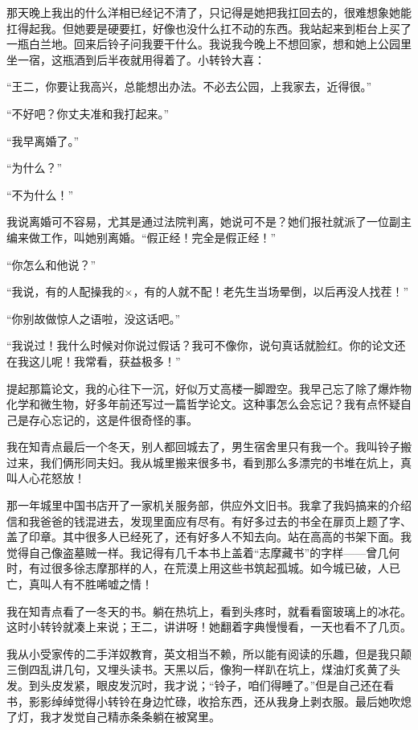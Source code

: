  那天晚上我出的什么洋相已经记不清了，只记得是她把我扛回去的，很难想象她能扛得起我。但她要是硬要扛，好像也没什么扛不动的东西。我站起来到柜台上买了一瓶白兰地。回来后铃子问我要干什么。我说我今晚上不想回家，想和她上公园里坐一宿，这瓶酒到后半夜就用得着了。小转铃大喜： 
 
 “王二，你要让我高兴，总能想出办法。不必去公园，上我家去，近得很。” 
 
 “不好吧？你丈夫准和我打起来。” 
 
 “我早离婚了。” 
 
 “为什么？” 
 
 “不为什么！” 
 
 我说离婚可不容易，尤其是通过法院判离，她说可不是？她们报社就派了一位副主编来做工作，叫她别离婚。“假正经！完全是假正经！” 
 
 “你怎么和他说？” 
 
 “我说，有的人配操我的×，有的人就不配！老先生当场晕倒，以后再没人找茬！” 
 
 “你别故做惊人之语啦，没这话吧。” 
 
 “我说过！我什么时候对你说过假话？我可不像你，说句真话就脸红。你的论文还在我这儿呢！我常看，获益极多！” 
 
 提起那篇论文，我的心往下一沉，好似万丈高楼一脚蹬空。我早己忘了除了爆炸物化学和微生物，好多年前还写过一篇哲学论文。这种事怎么会忘记？我有点怀疑自己是存心忘记的，这是件很奇怪的事。 
 
 我在知青点最后一个冬天，别人都回城去了，男生宿舍里只有我一个。我叫铃子搬过来，我们俩形同夫妇。我从城里搬来很多书，看到那么多漂完的书堆在炕上，真叫人心花怒放！ 
 
 那一年城里中国书店开了一家机关服务部，供应外文旧书。我拿了我妈搞来的介绍信和我爸爸的钱混进去，发现里面应有尽有。有好多过去的书全在扉页上题了字、盖了印章。其中很多人已经死了，还有好多人不知去向。站在高高的书架下面。我觉得自己像盗墓贼一样。我记得有几千本书上盖着“志摩藏书”的字样——曾几何时，有过很多徐志摩那样的人，在荒漠上用这些书筑起孤城。如今城已破，人已亡，真叫人有不胜唏嘘之情！ 
 
 我在知青点看了一冬天的书。躺在热坑上，看到头疼时，就看看窗玻璃上的冰花。这时小转铃就凑上来说；王二，讲讲呀！她翻着字典慢慢看，一天也看不了几页。 
 
 我从小受家传的二手洋奴教育，英文相当不赖，所以能有阅读的乐趣，但是我只颠三倒四乱讲几句，又埋头读书。天黑以后，像狗一样趴在坑上，煤油灯炙黄了头发。到头皮发紧，眼皮发沉时，我才说；“铃子，咱们得睡了。”但是自己还在看书，影影绰绰觉得小转铃在身边忙碌，收拾东西，还从我身上剥衣服。最后她吹熄了灯，我才发觉自己精赤条条躺在被窝里。 
 
